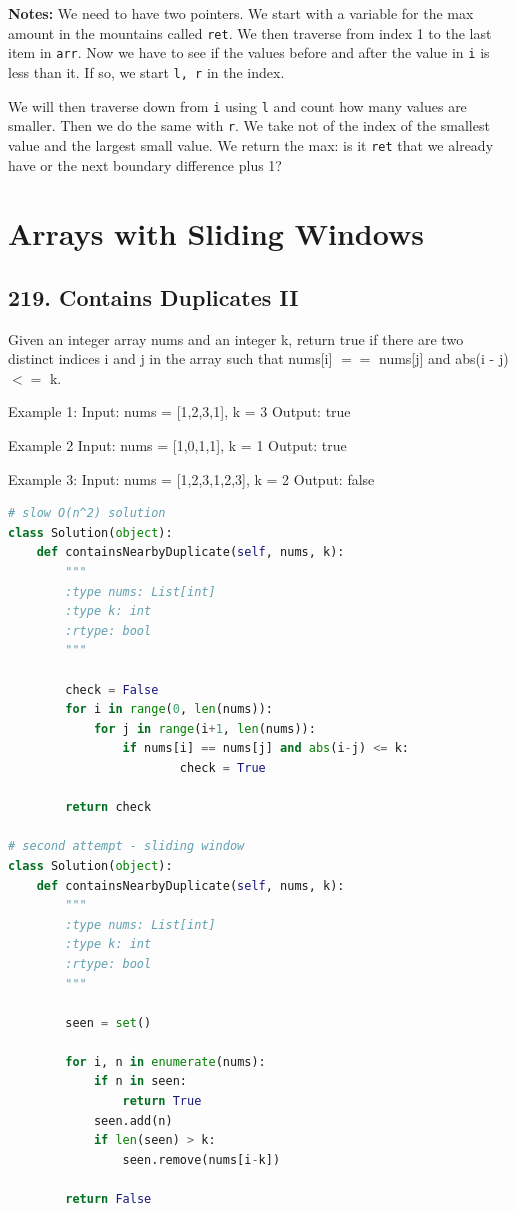 \documentclass[11pt]{article}
\begin{document}
\noindent \textbf{Notes:} We need to have two pointers. We start with a variable for the max amount in the mountains called \texttt{ret}. We then traverse from index 1 to the last item in \texttt{arr}. Now we have to see if the values before and after the value in \texttt{i} is less than it. If so, we start \texttt{l, r} in the index. 

\noindent We will then traverse down from \texttt{i} using \texttt{l} and count how many values are smaller. Then we do the same with \texttt{r}. We take not of the index of the smallest value and the largest small value. We return the max: is it \texttt{ret} that we already have or the next boundary difference plus 1?

\section*{Arrays with Sliding Windows}
\subsection*{219. Contains Duplicates II}
Given an integer array nums and an integer k, return true if there are two distinct indices i and j in the array such that nums[i] $==$ nums[j] and abs(i - j) $<=$ k.

Example 1:
Input: nums = [1,2,3,1], k = 3
Output: true

Example 2
Input: nums = [1,0,1,1], k = 1
Output: true

Example 3:
Input: nums = [1,2,3,1,2,3], k = 2
Output: false



\begin{lstlisting}[language=python, mathescape=true]
# slow O(n^2) solution
class Solution(object):
    def containsNearbyDuplicate(self, nums, k):
        """
        :type nums: List[int]
        :type k: int
        :rtype: bool
        """

        check = False
        for i in range(0, len(nums)):
            for j in range(i+1, len(nums)):
                if nums[i] == nums[j] and abs(i-j) <= k:
                        check = True

        return check

# second attempt - sliding window
class Solution(object):
    def containsNearbyDuplicate(self, nums, k):
        """
        :type nums: List[int]
        :type k: int
        :rtype: bool
        """

        seen = set()

        for i, n in enumerate(nums):
            if n in seen:
                return True
            seen.add(n)
            if len(seen) > k:
                seen.remove(nums[i-k])
        
        return False

\end{lstlisting}
\end{document}
